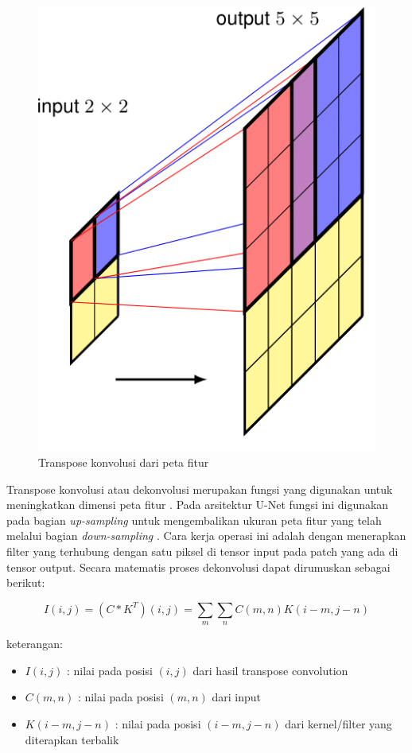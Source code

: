 \begin{figure}[H]
	\centering
	\includegraphics[scale=0.8]{gambar/deconv.png}
	\caption{Transpose konvolusi dari peta fitur \cite{bishop_deep_2024}}
	\label{fig:deconv}
\end{figure}


\noindent Transpose konvolusi atau dekonvolusi merupakan fungsi yang digunakan untuk meningkatkan dimensi peta fitur \cite{goodfellow_deep_2016,bishop_deep_2024}. Pada arsitektur U-Net fungsi ini digunakan pada bagian \textit{up-sampling} untuk mengembalikan ukuran peta fitur yang telah melalui bagian \textit{down-sampling} \cite{azad_medical_2022}. Cara kerja operasi ini adalah dengan menerapkan filter yang terhubung dengan satu piksel di tensor input pada patch yang ada di tensor output. Secara matematis proses dekonvolusi dapat dirumuskan sebagai berikut:

\begin{equation}
	I(i,j) = (C * K^T)(i,j) = \sum_{m} \sum_{n} C(m, n) K(i - m, j - n)
\end{equation}

\noindent
keterangan:
\begin{itemize}
	\item $I(i,j)$ : nilai pada posisi $(i,j)$ dari hasil transpose convolution
	\item $C(m,n)$ : nilai pada posisi $(m,n)$ dari input
	\item $K(i-m, j-n)$ : nilai pada posisi $(i-m, j-n)$ dari kernel/filter yang diterapkan terbalik
\end{itemize}



